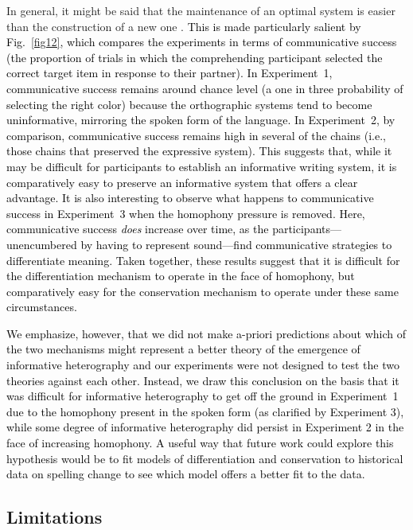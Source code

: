 \documentclass[doc,biblatex]{apa7}
\newcommand\newmaterial[1]{\textcolor{black}{#1}}
\newcommand\secondrevision[1]{\textcolor{black}{#1}}
\begin{document}
In general, it might be said that the maintenance of an optimal system is easier than the construction of a new one \parencite[see also][]{Smith:2002}. \newmaterial{This is made particularly salient by Fig.~\ref{fig12}, which compares the experiments in terms of communicative success (the proportion of trials in which the comprehending participant selected the correct target item in response to their partner). In Experiment~1, communicative success remains around chance level (a one in three probability of selecting the right color) because the orthographic systems tend to become uninformative, mirroring the spoken form of the language. In Experiment~2, by comparison, communicative success remains high in several of the chains (i.e., those chains that preserved the expressive system). This suggests that, while it may be difficult for participants to establish an informative writing system, it is comparatively easy to preserve an informative system that offers a clear advantage. It is also interesting to observe what happens to communicative success in Experiment~3 when the homophony pressure is removed. Here, communicative success \textit{does} increase over time, as the participants---unencumbered by having to represent sound---find communicative strategies to differentiate meaning. Taken together, these results suggest that it is difficult for the differentiation mechanism to operate in the face of homophony, but comparatively easy for the conservation mechanism to operate under these same circumstances.}

\secondrevision{We emphasize, however, that we did not make a-priori predictions about which of the two mechanisms might represent a better theory of the emergence of informative heterography and our experiments were not designed to test the two theories against each other. Instead, we draw this conclusion on the basis that it was difficult for informative heterography to get off the ground in Experiment~1 due to the homophony present in the spoken form (as clarified by Experiment 3), while some degree of informative heterography did persist in Experiment 2 in the face of increasing homophony. A useful way that future work could explore this hypothesis would be to fit models of differentiation and conservation to historical data on spelling change to see which model offers a better fit to the data.}

\subsection{Limitations}
\end{document}
